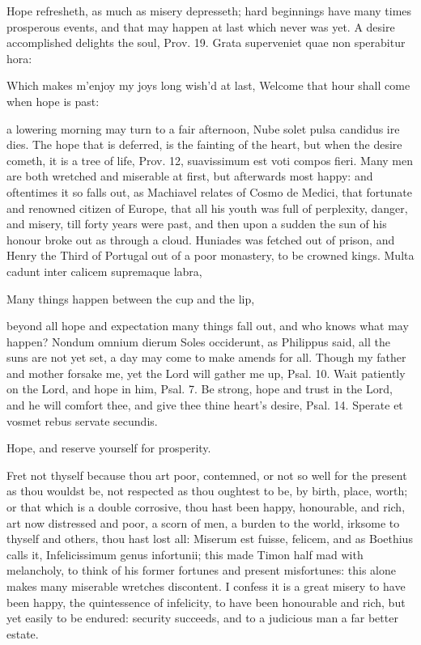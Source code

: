 {Hope refresheth, as much as misery depresseth; hard beginnings have
many times prosperous events, and that may happen at last which never
was yet. A desire accomplished delights the soul, Prov.  19.
Grata superveniet quae non sperabitur hora:

Which makes m'enjoy my joys long wish'd at last,
Welcome that hour shall come when hope is past:

a lowering morning may turn to a fair afternoon, Nube solet pulsa
candidus ire dies. The hope that is deferred, is the fainting of the
heart, but when the desire cometh, it is a tree of life, Prov. 
12, suavissimum est voti compos fieri. Many men are both wretched
and miserable at first, but afterwards most happy: and oftentimes it so
falls out, as Machiavel relates of Cosmo de Medici, that
fortunate and renowned citizen of Europe, that all his youth was full
of perplexity, danger, and misery, till forty years were past, and then
upon a sudden the sun of his honour broke out as through a cloud.
Huniades was fetched out of prison, and Henry the Third of Portugal out
of a poor monastery, to be crowned kings.
Multa cadunt inter calicem supremaque labra,

Many things happen between the cup and the lip,

beyond all hope and expectation many things fall out, and who knows
what may happen? Nondum omnium dierum Soles occiderunt, as Philippus
said, all the suns are not yet set, a day may come to make amends for
all. Though my father and mother forsake me, yet the Lord will gather
me up, Psal.  10. Wait patiently on the Lord, and hope in him,
Psal.  7. Be strong, hope and trust in the Lord, and he will
comfort thee, and give thee thine heart's desire, Psal.  14.
Sperate et vosmet rebus servate secundis.

Hope, and reserve yourself for prosperity.

Fret not thyself because thou art poor, contemned, or not so well for
the present as thou wouldst be, not respected as thou oughtest to be,
by birth, place, worth; or that which is a double corrosive, thou hast
been happy, honourable, and rich, art now distressed and poor, a scorn
of men, a burden to the world, irksome to thyself and others, thou hast
lost all: Miserum est fuisse, felicem, and as Boethius calls it,
Infelicissimum genus infortunii; this made Timon half mad with
melancholy, to think of his former fortunes and present misfortunes:
this alone makes many miserable wretches discontent. I confess it is a
great misery to have been happy, the quintessence of infelicity, to
have been honourable and rich, but yet easily to be endured:
security succeeds, and to a judicious man a far better estate.

}
